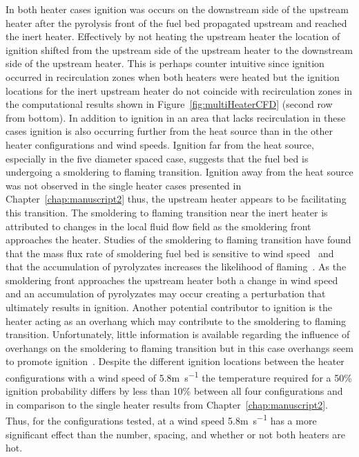     In both heater cases ignition was occurs on the downstream side of the upstream heater after the pyrolysis front of the fuel bed propagated upstream and reached the inert heater. Effectively by not heating the upstream heater the location of ignition shifted from the upstream side of the upstream heater to the downstream side of the upstream heater. This is perhaps counter intuitive since ignition occurred in recirculation zones when both heaters were heated but the ignition locations for the inert upstream heater do not coincide with recirculation zones in the computational results shown in Figure~\ref{fig:multiHeaterCFD} (second row from bottom). In addition to ignition in an area that lacks recirculation in these cases ignition is also occurring further from the heat source than in the other heater configurations and wind speeds. Ignition far from the heat source, especially in the five diameter spaced case, suggests that the fuel bed is undergoing a smoldering to flaming transition. Ignition away from the heat source was not observed in the single heater cases presented in Chapter~\ref{chap:manuscript2} thus, the upstream heater appears to be facilitating this transition. The smoldering to flaming transition near the inert heater is attributed to changes in the local fluid flow field as the smoldering front approaches the heater. Studies of the smoldering to flaming transition have found that the mass flux rate of smoldering fuel bed is sensitive to wind speed~\cite{Ohlemiller1990} and that the accumulation of pyrolyzates increases the likelihood of flaming~\cite{Stoliarov}. As the smoldering front approaches the upstream heater both a change in wind speed and an accumulation of pyrolyzates may occur creating a perturbation that ultimately results in ignition. Another potential contributor to ignition is the heater acting as an overhang which may contribute to the smoldering to flaming transition. Unfortunately, little information is available regarding the influence of overhangs on the smoldering to flaming transition but in this case overhangs seem to promote ignition~\cite{Santoso2019}. Despite the different ignition locations between the heater configurations with a wind speed of 5.8\si{\meter\per\second} the temperature required for a 50\% ignition probability differs by less than 10\% between all four configurations and in comparison to the single heater results from Chapter~\ref{chap:manuscript2}. Thus, for the configurations tested, at a wind speed 5.8\si{\meter\per\second} has a more significant effect than the number, spacing, and whether or not both heaters are hot.
    

